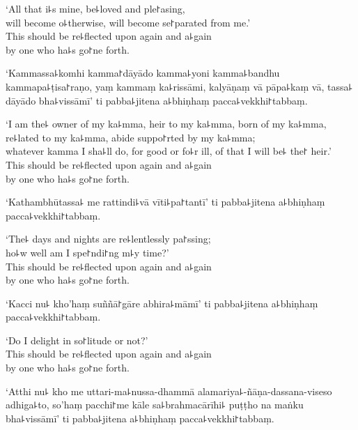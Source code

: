 \begin{english}
  `All that i꜕s mine, be꜕loved and ple꜓asing,\\
  will become o꜕therwise, will become se꜓parated from me.'\\
  This should be re꜕flected upon again and a꜕gain\\
  by one who ha꜕s go꜓ne forth.
\end{english}

`Kammassa꜕komhi kamma꜓dāyādo kamma꜕yoni kamma꜕bandhu kammapa꜕ṭisa꜓raṇo, yaṃ kammaṃ ka꜕rissāmi, kalyāṇaṃ vā pāpa꜕kaṃ vā, tassa꜕ dāyādo bha꜕vissāmī' ti pabba꜕jitena a꜕bhiṇhaṃ pacca꜕vekkhi꜓tabbaṃ.

\begin{english}
  `I am the꜕ owner of my ka꜕mma, heir to my ka꜕mma, born of my ka꜕mma,\\
  re꜕lated to my ka꜕mma, abide suppo꜓rted by my ka꜕mma;\\
  whatever kamma I sha꜕ll do, for good or fo꜕r ill, of that I will be꜕ the꜓ heir.'\\
  This should be re꜕flected upon again and a꜕gain\\
  by one who ha꜕s go꜓ne forth.
\end{english}

\clearpage

`Kathambhūtassa꜕ me rattindi꜕vā vīti꜕pa꜓tantī' ti pabba꜕jitena a꜕bhiṇhaṃ pacca꜕vekkhi꜓tabbaṃ.

\begin{english}
  `The꜕ days and nights are re꜕lentlessly pa꜓ssing;\\
  ho꜕w well am I spe꜓ndi꜓ng m꜕y time?'\\
  This should be re꜕flected upon again and a꜕gain\\
  by one who ha꜕s go꜓ne forth.
\end{english}

`Kacci nu꜕ kho'haṃ suññā꜓gāre abhira꜕māmī' ti pabba꜕jitena a꜕bhiṇhaṃ pacca꜕vekkhi꜓tabbaṃ.

\begin{english}
  `Do I delight in so꜓litude or not?'\\
  This should be re꜕flected upon again and a꜕gain\\
  by one who ha꜕s go꜓ne forth.
\end{english}

`Atthi nu꜕ kho me uttari-ma꜕nussa-dhammā alamariya꜕-ñāṇa-dassana-viseso adhiga꜕to, so'haṃ pacchi꜓me kāle sa꜕brahmacārīhi꜕ puṭṭho na maṅku bha꜕vissāmī' ti pabba꜕jitena a꜕bhiṇhaṃ pacca꜕vekkhi꜓tabbaṃ.

